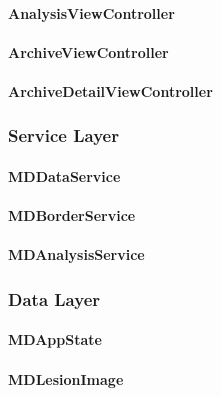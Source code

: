         \paragraph{AnalysisViewController}
            
        \paragraph{ArchiveViewController}
            
        \paragraph{ArchiveDetailViewController}
            

    \subsubsection{Service Layer}
        \paragraph{MDDataService}
            
        \paragraph{MDBorderService}
            
        \paragraph{MDAnalysisService}
            


    \subsubsection{Data Layer}

        \paragraph{MDAppState}
            
        \paragraph{MDLesionImage}
            
